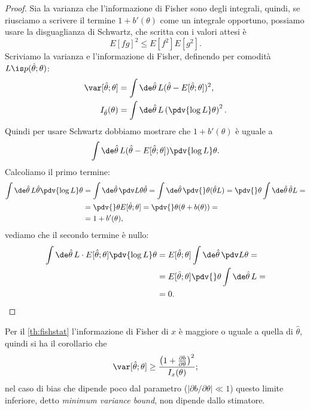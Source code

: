 \begin{proof}
	Sia la varianza che l'informazione di Fisher sono degli integrali, quindi,
	se riusciamo a scrivere il termine $1+b'(\theta)$ come un integrale opportuno,
	possiamo usare la disguaglianza di Schwartz,
	che scritta con i valori attesi è
	\begin{equation*}
		E[fg]^2 \le E[f^2]E[g^2].
	\end{equation*}
	Scriviamo la varianza e l'informazione di Fisher,
	definendo per comodità $L \is p(\hat\theta;\theta)$:
	\begin{align*}
		\var[\hat\theta;\theta]
		&= \int\de\hat\theta\, L (\hat\theta-E[\hat\theta;\theta])^2, \\
		I_{\hat\theta}(\theta)
		&= \int\de\hat\theta\, L \left( \pdv{\log L}\theta \right)^2.
	\end{align*}
	Quindi per usare Schwartz dobbiamo mostrare che $1+b'(\theta)$ è uguale a
	\begin{equation*}
		\int\de\hat\theta\, L (\hat\theta-E[\hat\theta;\theta]) \pdv{\log L}\theta.
	\end{equation*}
	Calcoliamo il primo termine:
	\begin{align*}
		\int \de\hat\theta\,
		L \hat\theta \pdv{\log L}\theta 
		&= \int \de\hat\theta\,
		\pdv L\theta \hat\theta
		= \int \de\hat\theta\,
		\pdv{}\theta (\hat\theta L)
		= \pdv{}\theta \int \de\hat\theta\, \hat\theta L = \\
		&= \pdv{}\theta E[\hat\theta;\theta]
		= \pdv{}\theta (\theta + b(\theta)) = \\
		&= 1 + b'(\theta),
	\end{align*}
	vediamo che il secondo termine è nullo:
	\begin{align*}
		\int \de\hat\theta\,
		L\cdot E[\hat\theta;\theta] \pdv{\log L}\theta
		&= E[\hat\theta;\theta] \int \de\hat\theta\, \pdv L\theta = \\
		&= E[\hat\theta;\theta] \pdv{}\theta \int \de\hat\theta\, L = \\
		&= 0. \qedhere
	\end{align*}
\end{proof}

Per il \autoref{th:fishstat} l'informazione di Fisher di $x$ è maggiore o uguale a quella di $\hat\theta$,
quindi si ha il corollario che
\begin{equation*}
	\var[\hat\theta;\theta] \ge \frac{\left( 1 + \frac{\partial b}{\partial\theta} \right)^2}{I_x(\theta)};
\end{equation*}
nel caso di bias che dipende poco dal parametro ($|\partial b/\partial\theta| \ll 1$)
questo limite inferiore, detto \emph{minimum variance bound}, non dipende dallo stimatore.


